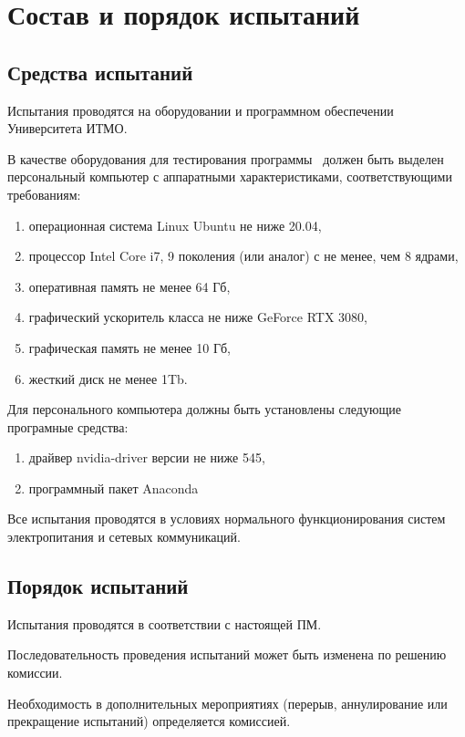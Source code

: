 \newpage
\section{Состав и порядок испытаний}

\subsection{Средства испытаний}

Испытания проводятся на оборудовании и программном обеспечении Университета ИТМО.

В качестве оборудования для тестирования программы \productnamesecond \ должен быть выделен персональный компьютер с аппаратными характеристиками, соответствующими требованиям:
\begin{enumerate}
    \item операционная система Linux Ubuntu не ниже 20.04,
    \item процессор Intel Core i7, 9 поколения (или аналог) с не менее, чем 8 ядрами,
    \item оперативная память не менее 64 Гб,
    \item графический ускоритель класса не ниже GeForce RTX 3080,
    \item графическая память не менее 10 Гб,
    \item жесткий диск не менее 1Tb.
\end{enumerate}

Для персонального компьютера должны быть установлены следующие програмные средства:
\begin{enumerate}
    \item драйвер nvidia-driver версии не ниже 545,
    \item программный пакет Anaconda
\end{enumerate}

Все испытания проводятся в условиях нормального функционирования систем электропитания и сетевых коммуникаций.


\subsection{Порядок испытаний}

Испытания проводятся в соответствии с настоящей ПМ.

Последовательность проведения испытаний может быть изменена по решению комиссии.

Необходимость в дополнительных мероприятиях (перерыв, аннулирование или прекращение испытаний) определяется комиссией.

